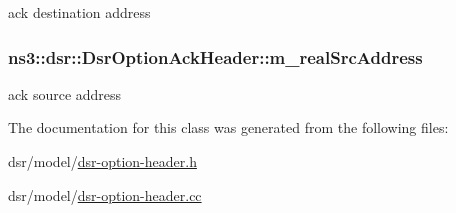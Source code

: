 ack destination address 

\subsubsection[{\texorpdfstring{m\+\_\+real\+Src\+Address}{m_realSrcAddress}}]{ ns3\+::dsr\+::\+Dsr\+Option\+Ack\+Header\+::m\+\_\+real\+Src\+Address\hspace{0.3cm}{\ttfamily [private]}}\hypertarget{classns3_1_1dsr_1_1DsrOptionAckHeader_ad060f430901fed7d8f971049570baf75}{}\label{classns3_1_1dsr_1_1DsrOptionAckHeader_ad060f430901fed7d8f971049570baf75}


ack source address 



The documentation for this class was generated from the following files\+:\begin{DoxyCompactItemize}
\item 
dsr/model/\hyperlink{dsr-option-header_8h}{dsr-\/option-\/header.\+h}\item 
dsr/model/\hyperlink{dsr-option-header_8cc}{dsr-\/option-\/header.\+cc}\end{DoxyCompactItemize}

